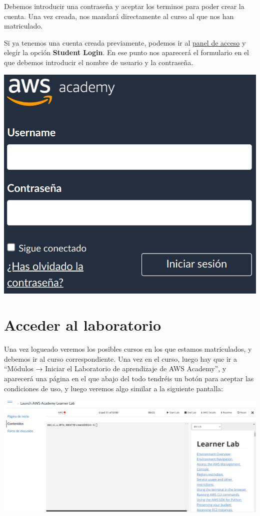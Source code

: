Debemos introducir una contraseña y aceptar los terminos para poder crear la cuenta. Una vez creada, nos mandará directamente al curso al que nos han matriculado.

Si ya tenemos una cuenta creada previamente, podemos ir al \href{https://www.awsacademy.com/vforcesite/LMS_Login}{panel de acceso} y elegir la opción \textbf{Student Login}. En ese punto nos aparecerá el formulario en el que debemos introducir el nombre de usuario y la contraseña.

\begin{center}
	\includegraphics[width=0.5\linewidth]{img/aws/login.png}
\end{center}

\chapter{Acceder al laboratorio}

Una vez logueado veremos los posibles cursos en los que estamos matriculados, y debemos ir al curso correspondiente. Una vez en el curso, luego hay que ir a “Módulos → Iniciar el Laboratorio de aprendizaje de AWS Academy”, y aparecerá una página en el que abajo del todo tendréis un botón para aceptar las condiciones de uso, y luego veremos algo similar a la siguiente pantalla:

\begin{center}
	\includegraphics[frame, width=0.9\linewidth]{img/aws/launcher.png}
\end{center}

